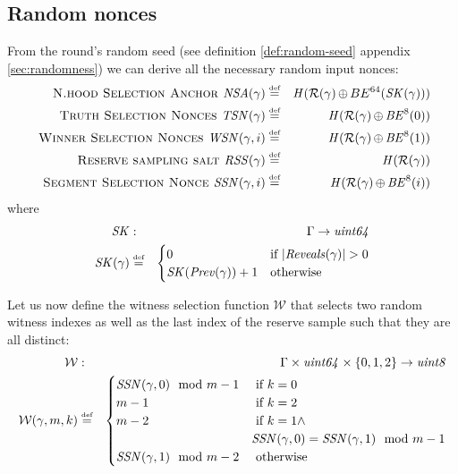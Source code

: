 \subsection{Random nonces}

\begin{definition}
\label{def:nonce-round}

From the round's random seed (see definition \ref{def:random-seed} appendix \ref{sec:randomness}) we can derive all the necessary random input nonces:
%
\begin{eqnarray}
\textsc{ N.hood Selection Anchor   }\mathit{NSA}(\gamma)&\overset{\textrm{\tiny def}}{=}&\mathit{H}(\mathcal{R}(\gamma)\operatorname{\operatorname{\oplus}} BE^{64}(\mathit{SK}(\gamma)))\\
\textsc{ Truth Selection Nonces  }\mathit{TSN}(\gamma)&\overset{\textrm{\tiny def}}{=}&\mathit{H}(\mathcal{R}(\gamma)\operatorname{\operatorname{\oplus}}\mathit{BE}^{8}(0)) \\
\textsc{ Winner Selection Nonces  }\mathit{WSN}(\gamma, i)&\overset{\textrm{\tiny def}}{=}&\mathit{H}(\mathcal{R}(\gamma)\operatorname{\operatorname{\oplus}}\mathit{BE}^{8}(1)) \\
\textsc{ Reserve sampling salt } \mathit{RSS}(\gamma)&\overset{\textrm{\tiny def}}{=}&\mathit{H}(\mathcal{R}(\gamma)) \\
\textsc{ Segment Selection Nonce } \mathit{SSN}(\gamma,i)&\overset{\textrm{\tiny def}}{=}&\mathit{H}(\mathcal{R}(\gamma)\operatorname{\operatorname{\oplus}}\mathit{BE}^{8}(i))
\end{eqnarray}
where 
\begin{eqnarray}
\mathit{SK}&:&\Gamma\to\mathit{uint64}\\
\mathit{SK}(\gamma)&\overset{\textrm{\tiny def}}{=}&\begin{cases}0&\text{if }\lvert\mathit{Reveals}(\gamma)\rvert>0\\
\mathit{SK}(\mathit{Prev}(\gamma))+1&\text{otherwise}
\end{cases}
\end{eqnarray}

Let us now define the witness selection function $\mathcal{W}$ that selects two random witness indexes as well as the last index of the reserve sample such that they are all distinct:
%
\begin{eqnarray}
\mathcal{W}&:&\Gamma\times\mathit{uint64}\times\{0,1,2\}\to\mathit{uint8}\\
\mathcal{W}(\gamma,m,k)&\overset{\textrm{\tiny def}}{=}&\begin{cases}
\mathit{SSN}(\gamma,0) \mod m-1&\text{ if }k=0\\
m-1&\text{ if }k=2\\
m-2&\text{ if }k=1 \land\\
& \mathit{SSN}(\gamma,0)=\mathit{SSN}(\gamma,1) \mod m-1\\
\mathit{SSN}(\gamma,1) \mod m-2&\text{ otherwise }
\end{cases}
\end{eqnarray}
\end{definition}

